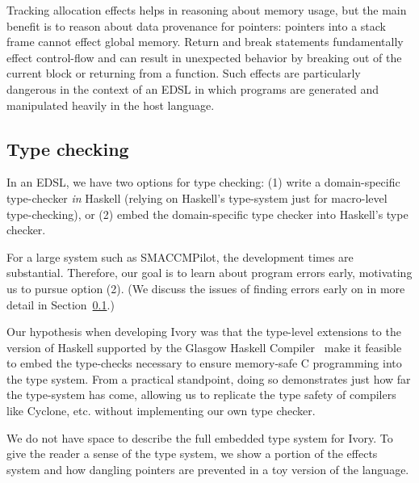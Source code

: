 \noindent
Tracking allocation effects helps in reasoning about memory usage, but the main
benefit is to reason about data provenance for pointers: pointers into a stack
frame cannot effect global memory.  Return and break statements fundamentally
effect control-flow and can result in unexpected behavior by breaking out of the
current block or returning from a function.  Such effects are particularly
dangerous in the context of an EDSL in which programs are generated and
manipulated heavily in the host language.

\subsection{Type checking}
In an EDSL, we have two options for type checking: (1) write a domain-specific
type-checker \emph{in} Haskell (relying on Haskell's type-system just for
macro-level type-checking), or (2) embed the domain-specific type checker into
Haskell's type checker.

For a large system such as SMACCMPilot, the development times are substantial.
Therefore, our goal is to learn about program errors early, motivating us to
pursue option (2).  (We discuss the issues of finding errors early on in more
detail in Section~\ref{}.)

Our hypothesis when developing Ivory was that the type-level extensions to the
version of Haskell supported by the Glasgow Haskell Compiler~\cite{}  make it feasible to embed the type-checks
necessary to ensure memory-safe C programming into the type system.  From a
practical standpoint, doing so demonstrates just how far the type-system has
come, allowing us to replicate the type safety of compilers like Cyclone,
etc. without implementing our own type checker.

We do not have space to describe the full embedded type system for Ivory.  To
give the reader a sense of the type system, we show a portion of the effects
system and how dangling pointers are prevented in a toy version of the language.

